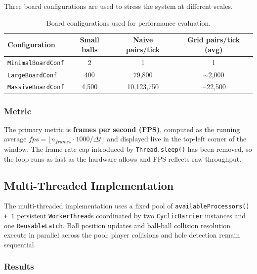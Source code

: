 \documentclass[12pt,a4paper]{article}
\begin{document}
Three board configurations are used to stress the system at different scales.

\begin{table}[H]
\centering
\begin{tabular}{lccc}
\hline
\textbf{Configuration} & \textbf{Small balls} & \textbf{Naive pairs/tick} & \textbf{Grid pairs/tick (avg)} \\
\hline
\texttt{MinimalBoardConf}  & 2       & 1               & 1               \\
\texttt{LargeBoardConf}    & 400     & 79{,}800        & $\sim$2{,}000   \\
\texttt{MassiveBoardConf}  & 4{,}500 & 10{,}123{,}750  & $\sim$22{,}500  \\
\hline
\end{tabular}
\caption{Board configurations used for performance evaluation.}
\label{tab:configs}
\end{table}

\subsubsection*{Metric}

The primary metric is \textbf{frames per second (FPS)}, computed as the
running average $\mathit{fps} = \lfloor n_{\mathit{frames}} \cdot 1000 /
\Delta t \rfloor$ and displayed live in the top-left corner of the window.
The frame rate cap introduced by \texttt{Thread.sleep()} has been removed,
so the loop runs as fast as the hardware allows and FPS reflects raw
throughput.

\subsection{Multi-Threaded Implementation}

The multi-threaded implementation uses a fixed pool of
\texttt{availableProcessors() + 1} persistent \texttt{WorkerThread}s
coordinated by two \texttt{CyclicBarrier} instances and one
\texttt{ReusableLatch}. Ball position updates and ball-ball collision
resolution execute in parallel across the pool; player collisions and
hole detection remain sequential.

\subsubsection*{Results}
\end{document}

